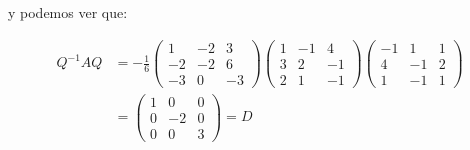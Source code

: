 \begin{ejemplo}
			y podemos ver que:

			\begin{align*}
				Q^{-1} A Q &= -\frac{1}{6}
				\begin{pmatrix}
					1 & -2 & 3 \\
					-2 & -2 & 6 \\
					-3 & 0 & -3
				\end{pmatrix}
				\begin{pmatrix}
					1 & -1 & 4 \\
					3 & 2 & -1 \\
					2 & 1 & -1
				\end{pmatrix}
				\begin{pmatrix}
					-1 & 1 & 1 \\
					4 & -1 & 2 \\
					1 & -1 & 1
				\end{pmatrix} \\
				&=
				\begin{pmatrix}
					1 & 0 & 0 \\
					0 & -2 & 0 \\
					0 & 0 & 3
				\end{pmatrix} = D
			\end{align*}
		\end{ejemplo}

